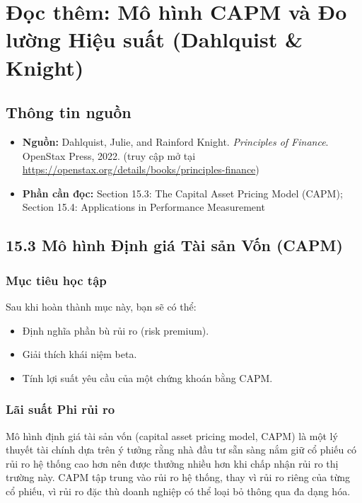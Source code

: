 \chapter{Đọc thêm: Mô hình CAPM và Đo lường Hiệu suất (Dahlquist \& Knight)}
\label{ch:M3L2-reading1}


\section{Thông tin nguồn}

\begin{itemize}
  \item \textbf{Nguồn:} Dahlquist, Julie, and Rainford Knight. \emph{Principles of Finance}. OpenStax Press, 2022. (truy cập mở tại \url{https://openstax.org/details/books/principles-finance})
  \item \textbf{Phần cần đọc:} Section 15.3: The Capital Asset Pricing Model (CAPM); Section 15.4: Applications in Performance Measurement
\end{itemize}

\section{15.3 Mô hình Định giá Tài sản Vốn (CAPM)}

\subsection*{Mục tiêu học tập}
Sau khi hoàn thành mục này, bạn sẽ có thể:
\begin{itemize}
  \item Định nghĩa phần bù rủi ro (risk premium).
  \item Giải thích khái niệm beta.
  \item Tính lợi suất yêu cầu của một chứng khoán bằng CAPM.
\end{itemize}

\subsection*{Lãi suất Phi rủi ro}

Mô hình định giá tài sản vốn (capital asset pricing model, CAPM) là một lý thuyết tài chính dựa trên ý tưởng rằng nhà đầu tư sẵn sàng nắm giữ cổ phiếu có rủi ro hệ thống cao hơn nên được thưởng nhiều hơn khi chấp nhận rủi ro thị trường này. CAPM tập trung vào rủi ro hệ thống, thay vì rủi ro riêng của từng cổ phiếu, vì rủi ro đặc thù doanh nghiệp có thể loại bỏ thông qua đa dạng hóa.

